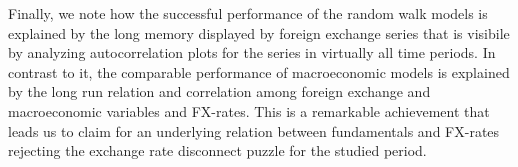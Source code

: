 Finally, we note how the successful performance of the random walk
models is explained by the long memory displayed by foreign exchange series that is visibile by analyzing autocorrelation plots for the series
in virtually all time periods.
In contrast to it, the comparable performance of  macroeconomic models is explained by the long run relation and correlation among foreign exchange and macroeconomic variables and FX-rates. This is a remarkable achievement that leads us to claim for an underlying relation between fundamentals and FX-rates rejecting the exchange rate disconnect puzzle for the studied period.
